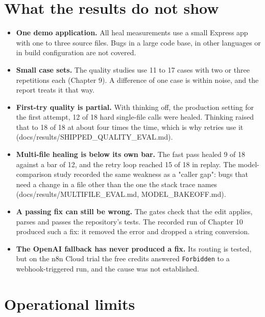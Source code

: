 \documentclass[11pt,a4paper]{report}
\begin{document}
\section{What the results do not show}

\begin{itemize}[leftmargin=*,itemsep=2pt]
\item \textbf{One demo application.} All heal measurements use a small Express app with one to three source files. Bugs in a large code base, in other languages or in build configuration are not covered.
\item \textbf{Small case sets.} The quality studies use 11 to 17 cases with two or three repetitions each (Chapter 9). A difference of one case is within noise, and the report treats it that way.
\item \textbf{First-try quality is partial.} With thinking off, the production setting for the first attempt, 12 of 18 hard single-file calls were healed. Thinking raised that to 18 of 18 at about four times the time, which is why retries use it (docs/results/SHIPPED\_QUALITY\_EVAL.md).
\item \textbf{Multi-file healing is below its own bar.} The fast pass healed 9 of 18 against a bar of 12, and the retry loop reached 15 of 18 in replay. The model-comparison study recorded the same weakness as a "caller gap": bugs that need a change in a file other than the one the stack trace names (docs/results/MULTIFILE\_EVAL.md, MODEL\_BAKEOFF.md).
\item \textbf{A passing fix can still be wrong.} The gates check that the edit applies, parses and passes the repository's tests. The recorded run of Chapter 10 produced such a fix: it removed the error and dropped a string conversion.
\item \textbf{The OpenAI fallback has never produced a fix.} Its routing is tested, but on the n8n Cloud trial the free credits answered \texttt{Forbidden} to a webhook-triggered run, and the cause was not established.
\end{itemize}

\section{Operational limits}
\end{document}
